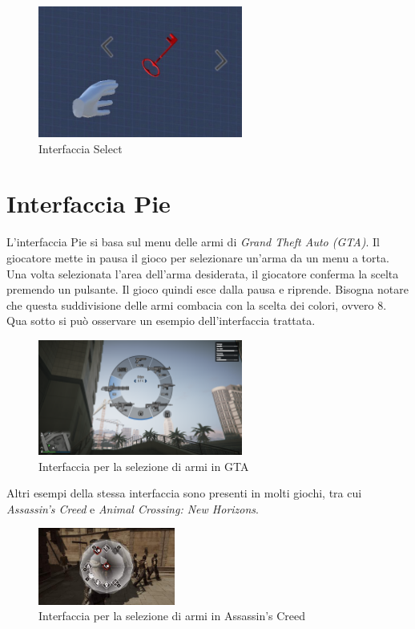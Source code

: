 \documentclass[target=bach,aauheader=]{thud}
\begin{document}
\begin{figure}[h]
    \centering
    \includegraphics[width=0.60\textwidth]{select}
    \caption{Interfaccia Select}
    \label{fig:select}
\end{figure}


\section{Interfaccia Pie} %
\label{pie}
L'interfaccia Pie si basa sul menu delle armi di \textit{Grand Theft Auto (GTA)}.
Il giocatore mette in pausa il gioco per selezionare un'arma da un menu a torta.
Una volta selezionata l'area dell'arma desiderata, il giocatore conferma la scelta premendo un pulsante.
Il gioco quindi esce dalla pausa e riprende.
Bisogna notare che questa suddivisione delle armi combacia con la scelta dei colori, ovvero 8. 
Qua sotto si può osservare un esempio dell'interfaccia trattata.

\begin{figure}[h]
    \centering
    \includegraphics[width=0.60\textwidth]{gta}
    \caption{Interfaccia per la selezione di armi in GTA}
    \label{fig:gta}
\end{figure}

Altri esempi della stessa interfaccia sono presenti in molti giochi, tra cui \textit{Assassin's Creed} e \textit{Animal Crossing: New Horizons}.

\begin{figure}[h]
    \centering
    \includegraphics[width=0.40\textwidth]{ac}
    \caption{Interfaccia per la selezione di armi in Assassin's Creed}
    \label{fig:ac}
\end{figure}
\end{document}
